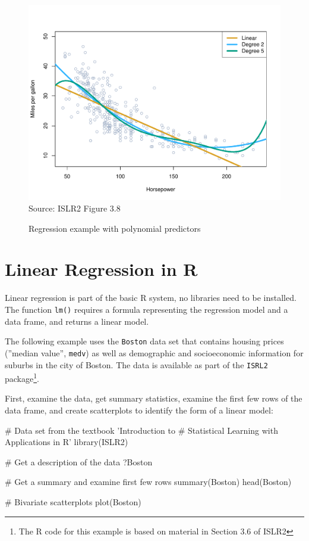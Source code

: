 \begin{figure}
\centering

\includegraphics[width=.8\textwidth]{../class11/Figures_Chapters_1-6/Chapter3/3_8.pdf} \\

\scriptsize Source: ISLR2 Figure 3.8
\caption{Regression example with polynomial predictors}
\label{fig:polynomial_chap12}
\end{figure}


\FloatBarrier
\section{Linear Regression in R}

Linear regression is part of the basic R system, no libraries need to be installed. The function \texttt{lm()} requires a formula representing the regression model and a data frame, and returns a linear model. 

The following example uses the \texttt{Boston} data set that contains housing prices (''median value'', \texttt{medv}) as well as demographic and socioeconomic information for suburbs in the city of Boston. The data is available as part of the \texttt{ISRL2} package\footnote{The R code for this example is based on material in Section 3.6 of ISLR2}.

First, examine the data, get summary statistics, examine the first few rows of the data frame, and create scatterplots to identify the form of a linear model:

\begin{samepage}
\begin{Rcode}
# Data set from the textbook 'Introduction to 
# Statistical Learning with Applications in R'
library(ISLR2)

# Get a description of the data
?Boston

# Get a summary and examine first few rows
summary(Boston)
head(Boston)

# Bivariate scatterplots
plot(Boston)
\end{Rcode}
\end{samepage}

